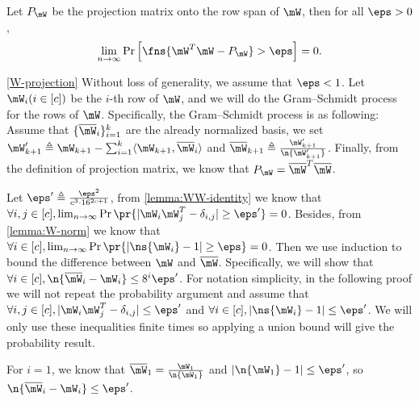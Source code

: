 \begin{lemma}
\label{W-projection}
Let $P_\mW$ be the projection matrix onto the row span of $\mW$, then for all $\eps>0$,
\begin{equation}
    \lim_{n\to\infty}\Pr\left[\fns{\mW^T\mW-P_\mW}>\eps\right]=0.
\end{equation}
\end{lemma}
\begin{proofof}{\cref{W-projection}}
Without loss of generality, we assume that $\eps<1$. Let $\mW_i(i\in[c])$ be the $i$-th row of $\mW$, and we will do the Gram–Schmidt process for the rows of $\mW$. Specifically, the Gram–Schmidt process is as following: Assume that $\{\overline{\mW}_i\}_{i=1}^k$ are the already normalized basis, we set $\mW_{k+1}'\triangleq \mW_{k+1} - \sum_{i=1}^k\langle \mW_{k+1}, \overline{\mW}_i\rangle$ and $\overline{\mW}_{k+1}\triangleq\frac{\mW_{k+1}'}{\n{\mW_{k+1}'}}$. Finally, from the definition of projection matrix, we know that $P_\mW=\overline{\mW}^T\overline{\mW}$.

Let $\eps'\triangleq \frac{\eps^2}{c^3\cdot 16^{2c+1}}$, from \cref{lemma:WW-identity} we know that $\forall i,j\in[c], \lim_{n\to\infty}\Pr\pr{|\mW_i\mW_j^T-\delta_{i,j}|\geq\eps'}=0$. Besides, from \cref{lemma:W-norm} we know that
$\forall i\in[c], \lim_{n\to\infty}\Pr\pr{|\ns{\mW_i}-1|\geq\eps}=0$. Then we use induction to bound the difference between $\mW$ and $\overline{\mW}$. Specifically, we will show that $\forall i\in[c], \n{\overline{\mW}_i-\mW_i}\leq 8^{i}\eps'$. For notation simplicity, in the following proof we will not repeat the probability argument and assume that $\forall i,j\in[c], |\mW_i\mW_j^T-\delta_{i,j}|\leq\eps'$ and $\forall i\in[c], |\ns{\mW_i}-1|\leq\eps'$. We will only use these inequalities finite times so applying a union bound will give the probability result.

For $i=1$, we know that $\overline{\mW}_1 = \frac{\mW_1}{\n{\mW_1}}$ and $|\n{\mW_1}-1|\leq\eps'$, so $\n{\overline{\mW}_i-\mW_i}\leq \eps'$.


\end{proofof}
